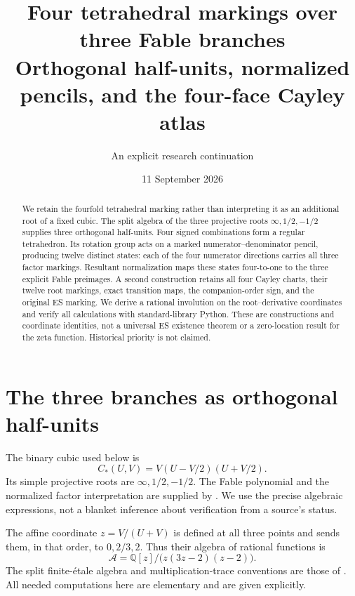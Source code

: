 \documentclass[11pt]{article}
\title{Four tetrahedral markings over three Fable branches\\
\large Orthogonal half-units, normalized pencils, and the four-face Cayley atlas}
\author{An explicit research continuation}
\date{11 September 2026}
\theoremstyle{remark}\newtheorem{remark}[theorem]{Remark}
\newcommand{\Q}{\mathbb Q}\newcommand{\R}{\mathbb R}\newcommand{\C}{\mathbb C}
\begin{document}
\maketitle
\begin{abstract}
We retain the fourfold tetrahedral marking rather than interpreting it as an additional root of a fixed cubic. The split algebra of the three projective roots $\infty,1/2,-1/2$ supplies three orthogonal half-units. Four signed combinations form a regular tetrahedron. Its rotation group acts on a marked numerator--denominator pencil, producing twelve distinct states: each of the four numerator directions carries all three factor markings. Resultant normalization maps these states four-to-one to the three explicit Fable preimages. A second construction retains all four Cayley charts, their twelve root markings, exact transition maps, the companion-order sign, and the original ES marking. We derive a rational involution on the root--derivative coordinates and verify all calculations with standard-library Python. These are constructions and coordinate identities, not a universal ES existence theorem or a zero-location result for the zeta function. Historical priority is not claimed.
\end{abstract}

\section{The three branches as orthogonal half-units}
The binary cubic used below is
\[
 C_*(U,V)=V(U-V/2)(U+V/2).
\]
Its simple projective roots are $\infty,1/2,-1/2$. The Fable polynomial and the normalized factor interpretation are supplied by \citet[eqs.~(1), (2), (5), (7), (10)]{tao}. We use the precise algebraic expressions, not a blanket inference about verification from a source's status.

The affine coordinate $z=V/(U+V)$ is defined at all three points and sends them, in that order, to $0,2/3,2$. Thus their algebra of rational functions is
\[
 \mathcal A=\Q[z]/\bigl(z(3z-2)(z-2)\bigr).
\]
The split finite-\'etale algebra and multiplication-trace conventions are those of \citet[\S4.2, Definition~4.29; \S4.3, Definition~4.46]{sutherland}. All needed computations here are elementary and are given explicitly.
\end{document}
